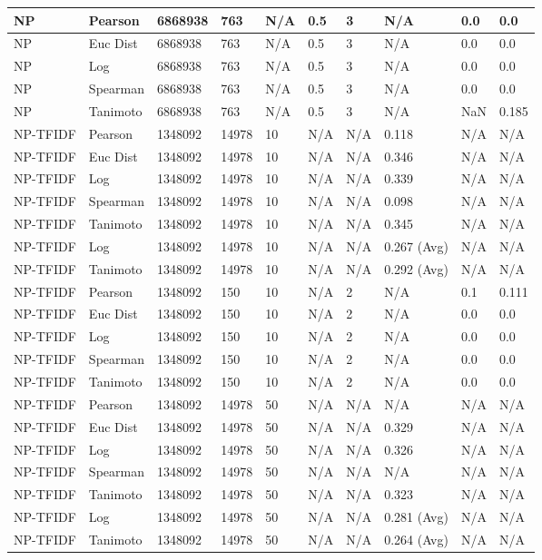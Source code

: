 \documentclass{article}
\begin{document}
\begin{longtable}{ |p{1.7cm}|p{1.9cm}|p{1.5cm}|p{1.5cm}|p{0.75cm}|p{0.75cm}|p{0.75cm}|p{0.75cm}|p{1.5cm}|p{1.5cm}|}
    NP & Pearson & 6868938 & 763 & N/A &  0.5  & 3 & N/A & 0.0 & 0.0  \\ \hline
    NP & Euc Dist & 6868938 & 763 & N/A &  0.5  & 3  & N/A &0.0 & 0.0   \\ \hline
    NP & Log & 6868938 & 763 & N/A &  0.5  & 3  & N/A & 0.0 & 0.0  \\ \hline
    NP & Spearman & 6868938 & 763 & N/A &  0.5  & 3  & N/A &0.0 & 0.0 \\ \hline
    NP & Tanimoto & 6868938 & 763 & N/A &  0.5  & 3 & N/A & NaN & 0.185 \\ \hline
    
    NP-TFIDF & Pearson & 1348092 & 14978 & 10 & N/A & N/A & 0.118 & N/A & N/A  \\ \hline
    NP-TFIDF  & Euc Dist & 1348092 & 14978 & 10 & N/A & N/A & 0.346 & N/A & N/A   \\ \hline
    NP-TFIDF  & Log & 1348092 & 14978 & 10 & N/A &  N/A& 0.339 & N/A & N/A  \\ \hline
    NP-TFIDF  & Spearman & 1348092 & 14978 & 10 & N/A & N/A & 0.098  & N/A & N/A \\ \hline
    NP-TFIDF  & Tanimoto & 1348092 & 14978 & 10 & N/A& N/A & 0.345 & N/A & N/A \\ \hline
    NP-TFIDF  & Log & 1348092 & 14978 & 10 & N/A& N/A & 0.267 (Avg) & N/A & N/A \\ \hline
    NP-TFIDF  & Tanimoto & 1348092 & 14978 & 10 & N/A & N/A & 0.292 (Avg) & N/A & N/A \\ \hline
    
    NP-TFIDF  & Pearson & 1348092 & 150 & 10 & N/A  & 2 & N/A & 0.1 & 0.111  \\ \hline
    NP-TFIDF  & Euc Dist & 1348092 & 150 & 10 & N/A  & 2 & N/A &0.0 & 0.0   \\ \hline
    NP-TFIDF  & Log & 1348092 & 150 & 10 & N/A & 2 & N/A & 0.0 & 0.0  \\ \hline
    NP-TFIDF  & Spearman & 1348092 & 150 & 10 & N/A  & 2 & N/A &0.0 & 0.0 \\ \hline
    NP-TFIDF  & Tanimoto & 1348092 & 150 & 10 & N/A  & 2 & N/A & 0.0 & 0.0 \\ \hline
    
    NP-TFIDF & Pearson & 1348092 & 14978 & 50 & N/A & N/A & N/A & N/A & N/A  \\ \hline
    NP-TFIDF  & Euc Dist & 1348092 & 14978 & 50 & N/A & N/A & 0.329 & N/A & N/A   \\ \hline
    NP-TFIDF  & Log & 1348092 & 14978 &  50 & N/A & N/A & 0.326 & N/A & N/A  \\ \hline
    NP-TFIDF  & Spearman & 1348092 & 14978 & 50 & N/A & N/A & N/A & N/A & N/A \\ \hline
    NP-TFIDF  & Tanimoto & 1348092 & 14978 & 50 & N/A& N/A & 0.323 & N/A & N/A \\ \hline
    NP-TFIDF  & Log & 1348092 & 14978 & 50 & N/A& N/A & 0.281 (Avg) & N/A & N/A \\ \hline
    NP-TFIDF  & Tanimoto & 1348092 & 14978 & 50 & N/A & N/A & 0.264 (Avg) & N/A & N/A \\ \hline
    

\end{longtable}
\end{document}
